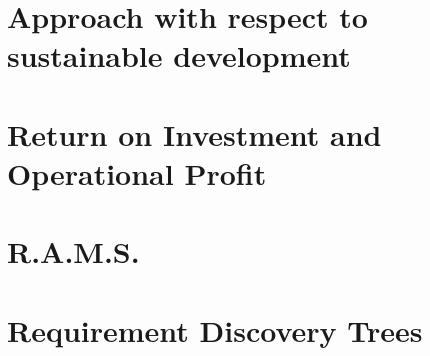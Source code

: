 \documentclass[11pt]{report}
\begin{document}




%
%

\chapter{Approach with respect to sustainable development}
\label{blSustainable}





%
%

\chapter{Return on Investment and Operational Profit}
\label{blInvestment}


%
%

\chapter{R.A.M.S.}
\label{blRAMS1}


%
%




%
%

\appendix
\chapter{Requirement Discovery Trees}
\label{reqdisctree}
\end{document}
